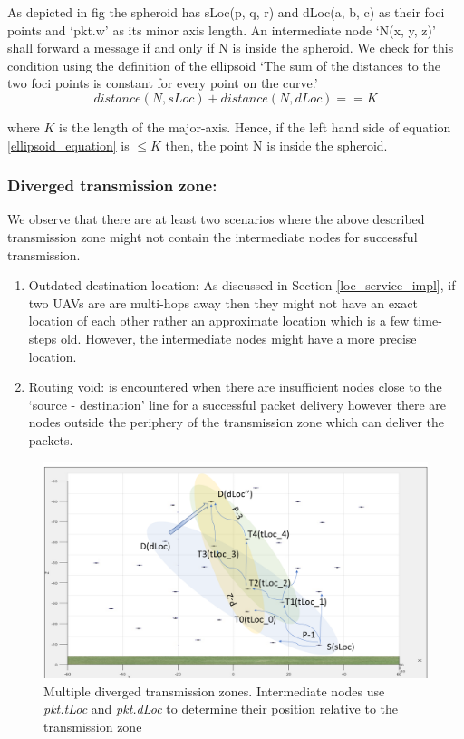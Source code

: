 As depicted in fig  the spheroid has sLoc(p, q, r) and dLoc(a, b, c) as their foci points and `pkt.w' as its minor axis length. An intermediate node `N(x, y, z)' shall forward a message if and only if N is inside the spheroid. We check for this condition using the definition of the ellipsoid `The sum of the distances to the two foci points is constant for every point on the curve.'
\begin{equation} \label{ellipsoid_equation}
    distance(N, sLoc) + distance(N, dLoc) == K
\end{equation}

where $K$ is the length of the major-axis. Hence, if the left hand side of equation \ref{ellipsoid_equation} is $\leq K$ then, the point N is inside the spheroid.

\subsubsection{Diverged transmission zone:}
\label{diverged_trans_zone}
We observe that there are at least two scenarios where the above described transmission zone might not contain the intermediate nodes for successful transmission. 
\begin{enumerate}
    \item Outdated destination location: As discussed in Section \ref{loc_service_impl}, if two UAVs are are multi-hops away then they might not have an exact location of each other rather an approximate location which is a few time-steps old. However, the intermediate nodes might have a more precise location.
    
    \item Routing void: is encountered when there are insufficient nodes close to the `source - destination' line for a successful packet delivery however there are nodes outside the periphery of the transmission zone which can deliver the packets.  
\end{enumerate}

\begin{figure}[hbtp]
    \centering
    \includegraphics[width=1\textwidth]{Chapter-4/figs/diverge_zone}
    \caption{Multiple diverged transmission zones. Intermediate nodes use \emph{pkt.tLoc} and \emph{pkt.dLoc} to determine their position relative to the transmission zone}
    \label{fig:diverged_transmission_zone}
\end{figure}

